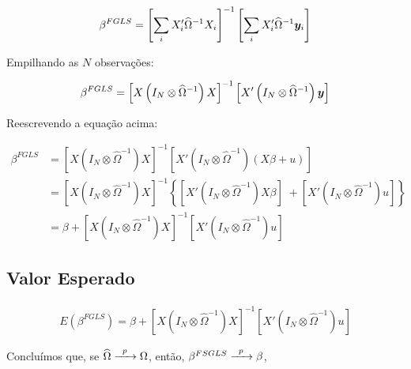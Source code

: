 \documentclass[11pt,oneside,a4paper]{article}
\numberwithin{equation}{section}
\begin{document}
\vspace{-1.5 em}
\begin{align*}
	\beta^{FGLS}
	= 
	\left[ 
		\sum_{i} X_{i}' \widehat{\Omega}^{-1} X_{i}
	\right]^{-1}
	\left[ 
		\sum_{i} X_{i}' \widehat{\Omega}^{-1} \boldsymbol{y}_{i}
	\right]
\end{align*}

Empilhando as $N$ observações:

\vspace{-1.5 em}
\begin{align*}
\beta^{FGLS}
= 
\left[ X \left( I_{N} \otimes \widehat{\Omega}^{-1} \right) X \right]^{-1}
\left[ X' \left( I_{N} \otimes \widehat{\Omega}^{-1} \right) \boldsymbol{y} \right]
\end{align*}

Reescrevendo a equação acima:

\vspace{-1.5 em}
\begin{align*}
\beta^{FGLS}
&= 
\left[  X \left( I_{N} \otimes \widehat{\Omega}^{-1} \right) X \right]^{-1}
\left[  X' \left( I_{N} \otimes \widehat{\Omega}^{-1} \right) (X \beta + u) \right]
\\
&= 
\left[ X \left( I_{N} \otimes \widehat{\Omega}^{-1} \right) X \right]^{-1}
\left\{ 
\left[ X' \left( I_{N} \otimes \widehat{\Omega}^{-1} \right) X \beta \right]
\; +
\left[ X' \left( I_{N} \otimes \widehat{\Omega}^{-1} \right) u \right]
\right\}
\\
&= 
\beta +
\left[ X \left( I_{N} \otimes \widehat{\Omega}^{-1} \right) X \right]^{-1}
\left[ X' \left( I_{N} \otimes \widehat{\Omega}^{-1} \right) u \right]
\end{align*}

\subsection*{Valor Esperado}

\vspace{-1 em}
\begin{align*}
E(\beta^{FGLS})
= 
\beta +
\left[ X \left( I_{N} \otimes \widehat{\Omega}^{-1} \right) X \right]^{-1}
\left[ X' \left( I_{N} \otimes \widehat{\Omega}^{-1} \right) u \right]
\end{align*}

Concluímos que, se 
$\widehat{\Omega} \xrightarrow{\enskip p \enskip} \Omega$,
então,
$\beta^{FSGLS} \xrightarrow{\enskip p \enskip} \beta$,
\end{document}
